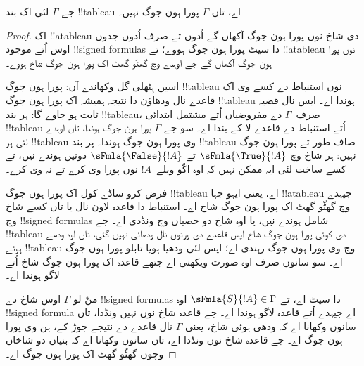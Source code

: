 \documentclass[../../../include/open-logic-section]{subfiles}
\begin{document}
\begin{thm}
  جے $\Gamma$ لئی اک بند !!{tableau} اے، تاں $\Gamma$ پورا ہون جوگ نہیں۔
\end{thm}

\begin{proof}
اک !!a{tableau} دی شاخ نوں پورا ہون جوگ آکھاں گے اُدوں تے صرف اُدوں
جدوں اوس اُتے موجود !!{signed formula}s دا سیٹ پورا ہون جوگ ہووے؛
تے !!a{tableau} نوں پورا ہون جوگ آکھاں گے جے اوہدے وچ گھٹّو گھٹ
اک پورا ہون جوگ شاخ ہووے۔

اسیں ہِٹھلی گل وکھاندے آں: پورا ہون جوگ !!{tableau} نوں استنباط دے
کسے وی اک قاعدے نال ودھاؤن دا نتیجہ ہمیشہ اک پورا ہون جوگ
!!{tableau} ہوندا اے۔ ایس نال قضیہ ثابت ہو جاوے گا: ہر بند
!!{tableau}، صرف~$\Gamma$ دے مفروضیاں اُتے مشتمل ابتدائی
!!{tableau} اُتے استنباط دے قاعدے لا کے بندا اے۔ سو جے $\Gamma$
پورا ہون جوگ ہوندا، تاں اوہدے لئی ہر !!{tableau} وی پورا ہون جوگ
ہوندا۔ پر بند !!{tableau} صاف طور تے پورا ہون جوگ نہیں: ہر شاخ
وچ $\sFmla{\True}{!A}$ تے $\sFmla{\False}{!A}$ دونیں ہوندے نیں،
تے کسے ساخت لئی ایہ ممکن نہیں کہ اوہ اکّو ویلے~$!A$ نوں پورا
وی کرے تے نہ وی کرے۔

فرض کرو ساڈے کول اک پورا ہون جوگ !!{tableau} اے، یعنی ایہو جہا
!!a{tableau} جیہدے وچ گھٹّو گھٹ اک پورا ہون جوگ شاخ اے۔ استنباط دا
قاعدہ لاون نال یا تاں کسے شاخ وچ !!{signed formula}s شامل ہوندے
نیں، یا اوہ شاخ دو حصیاں وچ ونڈدی اے۔ جے !!{tableau} دی کوئی
پورا ہون جوگ شاخ ایس قاعدے دی ورتوں نال ودھائی نہیں گئی، تاں اوہ
ودھے ہوئے !!{tableau} وچ وی پورا ہون جوگ رہندی اے؛ ایس لئی ودھیا
ہویا تابلو پورا ہون جوگ اے۔ سو سانوں صرف اوہ صورت ویکھنی اے جتھے
قاعدہ اک پورا ہون جوگ شاخ اُتے لاگو ہوندا اے۔

منّ لو $\Gamma$ اوس شاخ دے !!{signed formula}s دا سیٹ اے، تے
$\sFmla{S}{!A} \in \Gamma$ اوہ !!{signed formula} اے جیہدے اُتے
قاعدہ لاگو ہوندا اے۔ جے قاعدہ شاخ نوں نہیں ونڈدا، تاں سانوں
وکھانا اے کہ ودھی ہوئی شاخ، یعنی $\Gamma$ نال قاعدے دے نتیجے
جوڑ کے، ہن وی پورا ہون جوگ اے۔ جے قاعدہ شاخ نوں ونڈدا اے، تاں
سانوں وکھانا اے کہ بنیاں دو شاخاں وچوں گھٹّو گھٹ اک پورا ہون جوگ اے۔


\end{proof}
\end{document}
